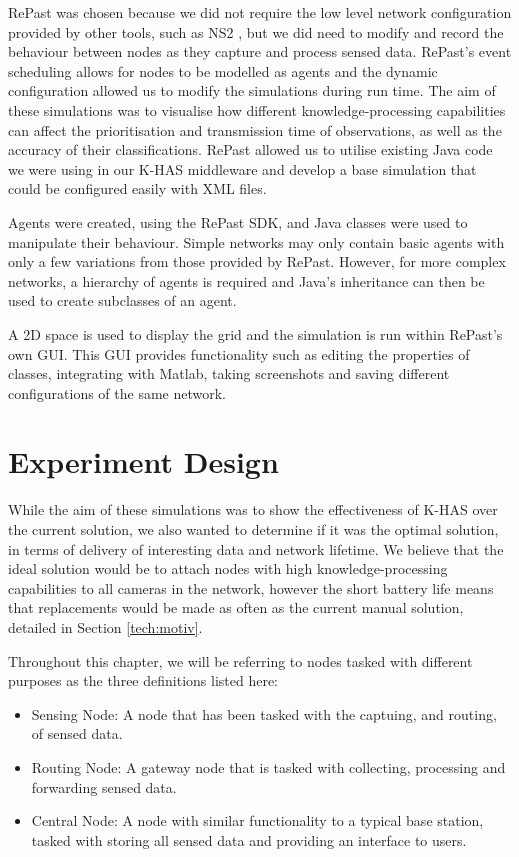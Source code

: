 RePast was chosen because we did not require the low level network configuration provided by other tools, such as NS2 \cite{mccanne1997network}, but we did need to modify and record the behaviour between nodes as they capture and process sensed data. RePast's event scheduling allows for nodes to be modelled as agents and the dynamic configuration allowed us to modify the simulations during run time. The aim of these simulations was to visualise how different knowledge-processing capabilities can affect the prioritisation and transmission time of observations, as well as the accuracy of their classifications. RePast allowed us to utilise existing Java code we were using in our K-HAS middleware and develop a base simulation that could be configured easily with XML files.

Agents were created, using the RePast SDK, and Java classes were used to manipulate their behaviour. Simple networks may only contain basic agents with only a few variations from those provided by RePast. However, for more complex networks, a hierarchy of agents is required and Java's inheritance can then be used to create subclasses of an agent.

A 2D space is used to display the grid and the simulation is run within RePast's own GUI. This GUI provides functionality such as editing the properties of classes, integrating with Matlab, taking screenshots and saving different configurations of the same network.


\section{Experiment Design}\label{sim:imp}
	While the aim of these simulations was to show the effectiveness of K-HAS over the current solution, we also wanted to determine if it was the optimal solution, in terms of delivery of interesting data and network lifetime. We believe that the ideal solution would be to attach nodes with high knowledge-processing capabilities to all cameras in the network, however the short battery life means that replacements would be made as often as the current manual solution, detailed in Section \ref{tech:motiv}.

	Throughout this chapter, we will be referring to nodes tasked with different purposes as the three definitions listed here:
	\begin{itemize}
		\item Sensing Node: A node that has been tasked with the captuing, and routing, of sensed data.
		\item Routing Node: A gateway node that is tasked with collecting, processing and forwarding sensed data.
		\item Central Node: A node with similar functionality to a typical base station, tasked with storing all sensed data and providing an interface to users.
	\end{itemize}

